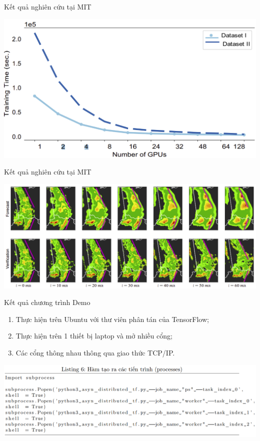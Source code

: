 \documentclass[notheorems,hyperref={bookmarks=true}]{beamer}
\theoremstyle{plain}
\numberwithin{equation}{section}
\begin{document}
\begin{footnotesize}
\begin{frame}{Kết quả nghiên cứu tại MIT}
\begin{center}
	\includegraphics[scale=0.42]{MIT_2.PNG}
\end{center}
\end{frame}


\begin{frame}{Kết quả nghiên cứu tại MIT}
\begin{center}
	\includegraphics[scale=0.42]{MIT_4.PNG}
\end{center}
\end{frame}

\begin{frame}{Kết quả chương trình Demo}
\begin{enumerate}[-]
	\item Thực hiện trên Ubuntu với thư viên phân tán của TensorFlow; \pause
	\item Thực hiện trên 1 thiết bị laptop và mở nhiều cổng;
	\item Các cổng thông nhau thông qua giao thức TCP/IP.
\end{enumerate}
\end{frame}

\begin{frame}
\begin{center}
\includegraphics[scale=0.52]{CODE1.PNG}
\end{center}
\end{frame}


\end{footnotesize}
\end{document}
